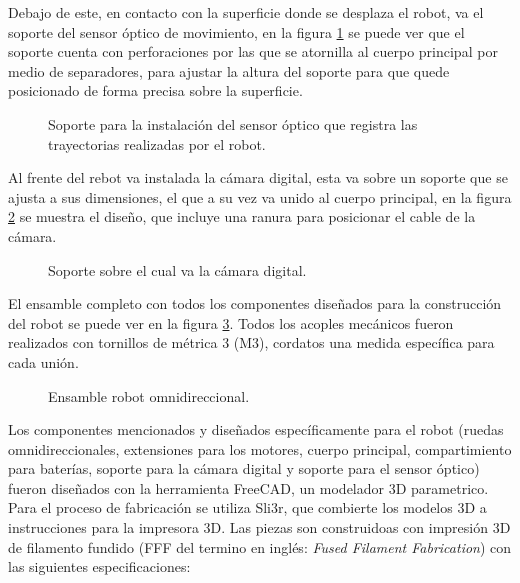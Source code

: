 \documentclass{iccmemoria}
\begin{document}
Debajo de este, en contacto con la superficie donde se desplaza el robot, va el soporte del sensor óptico de movimiento, en la figura \ref{fig:mouse_holder} se puede ver que el soporte cuenta con perforaciones por las que se atornilla al cuerpo principal por medio de separadores, para ajustar la altura del soporte para que quede posicionado de forma precisa sobre la superficie.\\

\begin{figure}[H]
  \centering
  
  \caption{Soporte para la instalación del sensor óptico que registra las trayectorias realizadas por el robot.}
  \label{fig:mouse_holder}
\end{figure}

Al frente del rebot va instalada la cámara digital, esta va sobre un soporte que se ajusta a sus dimensiones, el que a su vez va unido al cuerpo principal, en la figura \ref{fig:camera_holder} se muestra el diseño, que incluye una ranura para posicionar el cable de la cámara.\\

\begin{figure}[H]
  \centering
  
  \caption{Soporte sobre el cual va la cámara digital.}
  \label{fig:camera_holder}
\end{figure}

El ensamble completo con todos los componentes diseñados para la construcción del robot se puede ver en la figura \ref{fig:robot_assembly}. Todos los acoples mecánicos fueron realizados con tornillos de métrica 3 (M3), cordatos una medida específica para cada unión.

\begin{figure}[H]
  \centering
  
  \caption{Ensamble robot omnidireccional.}
  \label{fig:robot_assembly}
\end{figure}

Los componentes mencionados y diseñados específicamente para el robot (ruedas omnidireccionales, extensiones para los motores, cuerpo principal, compartimiento para baterías, soporte para la cámara digital y soporte para el sensor óptico) fueron diseñados con la herramienta FreeCAD, un modelador 3D parametrico. Para el proceso de fabricación se utiliza Sli3r, que combierte los modelos 3D a instrucciones para la impresora 3D. Las piezas son construidoas con impresión 3D de filamento fundido (FFF del termino en inglés: \emph{Fused Filament Fabrication}) con las siguientes especificaciones:\\
\end{document}
